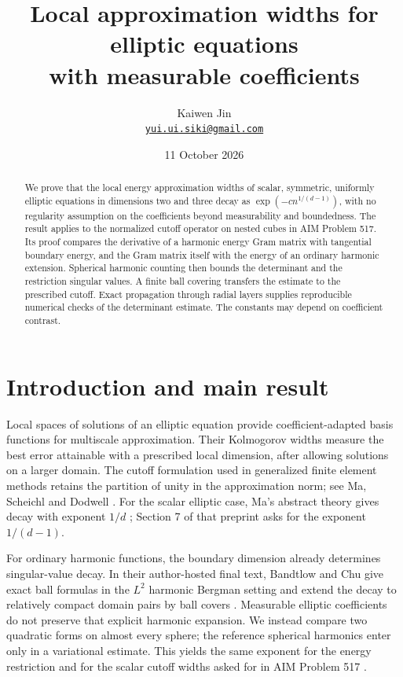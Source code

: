 \documentclass[11pt]{article}
\title{Local approximation widths for elliptic equations\protect\\ with measurable coefficients}
\author{Kaiwen Jin\\\small\href{mailto:yui.ui.siki@gmail.com}{\texttt{yui.ui.siki@gmail.com}}}
\date{11 October 2026}
\theoremstyle{remark}
\begin{document}
\maketitle
\begin{abstract}
We prove that the local energy approximation widths of scalar, symmetric,
uniformly elliptic equations in dimensions two and three decay as
$\exp(-c n^{1/(d-1)})$, with no regularity assumption on the coefficients
beyond measurability and boundedness. The result applies to the normalized
cutoff operator on nested cubes in AIM Problem 517. Its proof compares
the derivative of a harmonic energy Gram matrix with tangential boundary
energy, and the Gram matrix itself with the energy of an ordinary harmonic
extension. Spherical harmonic counting then bounds the determinant and
the restriction singular values. A finite ball covering transfers the
estimate to the prescribed cutoff. Exact propagation through radial
layers supplies reproducible numerical checks of the determinant estimate.
The constants may depend on coefficient contrast.
\end{abstract}

\section{Introduction and main result}
Local spaces of solutions of an elliptic equation provide coefficient-adapted
basis functions for multiscale approximation. Their Kolmogorov widths measure
the best error attainable with a prescribed local dimension, after allowing
solutions on a larger domain. The cutoff formulation used in generalized
finite element methods retains the partition of unity in the approximation
norm; see Ma, Scheichl and Dodwell \cite[Section 3.1]{MSD2021}.
For the scalar elliptic case, Ma's abstract theory gives decay with exponent
$1/d$ \cite[Theorem 3.8, Remark 3.9 and Section 6.1]{Ma2024};
Section 7 of that preprint asks for the exponent $1/(d-1)$.

For ordinary harmonic functions, the boundary dimension already determines
singular-value decay. In their author-hosted final text, Bandtlow and Chu
give exact ball formulas in the
$L^2$ harmonic Bergman setting and extend the decay to relatively compact
domain pairs by ball covers \cite[Proposition 3.3 and Theorem 4.5]{BandtlowChu2009}.
Measurable elliptic coefficients do not preserve that explicit harmonic
expansion. We instead compare two quadratic forms on almost every sphere;
the reference spherical harmonics enter only in a variational estimate.
This yields the same exponent for the energy restriction and for the
scalar cutoff widths asked for in AIM Problem 517 \cite{AIM517}.
\end{document}
